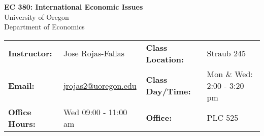 \begin{center}
\textbf{\huge EC 380: International Economic Issues}\\ 
\vspace{0.1in}
University of Oregon\\ 
Department of Economics\\ 
\end{center}
\vspace{-.2in}
\begin{center}\begin{tabular}{llll}
\toprule
    \textbf{Instructor:} & \footnotesize{Jose Rojas-Fallas} & \textbf{Class Location:}  & {\footnotesize Straub 245} \\ 
    \textbf{Email:} & \footnotesize{\href{mailto:jrojas2@uoregon.edu}{jrojas2@uoregon.edu}} & \textbf{Class Day/Time:} & \footnotesize{Mon \& Wed: 2:00 - 3:20 pm} \\
    \textbf{Office Hours:} & \footnotesize{Wed 09:00 - 11:00 am} & \textbf{Office:} & \footnotesize{PLC 525}\\
\bottomrule
\end{tabular}
\end{center}